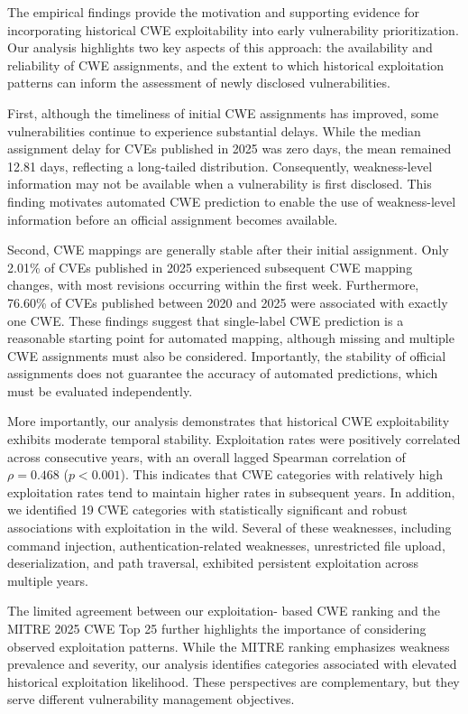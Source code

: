 \documentclass[conference,compsoc]{IEEEtran}
\begin{document}
The empirical findings provide the motivation and
supporting evidence for incorporating historical
CWE exploitability into early vulnerability
prioritization. Our analysis highlights two key
aspects of this approach: the availability and
reliability of CWE assignments, and the extent
to which historical exploitation patterns can
inform the assessment of newly disclosed
vulnerabilities.

First, although the timeliness of initial CWE
assignments has improved, some vulnerabilities
continue to experience substantial delays.
While the median assignment delay for CVEs
published in 2025 was zero days, the mean
remained 12.81 days, reflecting a long-tailed
distribution. Consequently, weakness-level
information may not be available when a
vulnerability is first disclosed. This finding
motivates automated CWE prediction to enable
the use of weakness-level information before
an official assignment becomes available.

Second, CWE mappings are generally stable after their initial assignment. Only 2.01\% of CVEs published in 2025 experienced subsequent CWE mapping changes, with most revisions occurring within the first week. Furthermore, 76.60\% of CVEs published between 2020 and 2025 were associated with exactly one CWE. These findings suggest that single-label CWE prediction is a reasonable starting point for automated mapping, although missing and multiple CWE assignments must also be considered. Importantly, the stability of official assignments does not guarantee the accuracy of automated predictions, which must be evaluated independently.

More importantly, our analysis demonstrates
that historical CWE exploitability exhibits
moderate temporal stability. Exploitation rates
were positively correlated across consecutive
years, with an overall lagged Spearman correlation
of $\rho=0.468$ ($p<0.001$). This indicates
that CWE categories with relatively high
exploitation rates tend to maintain higher
rates in subsequent years. In addition, we
identified 19 CWE categories with statistically
significant and robust associations with
exploitation in the wild. Several of these
weaknesses, including command injection,
authentication-related weaknesses, unrestricted
file upload, deserialization, and path traversal,
exhibited persistent exploitation across
multiple years.

The limited agreement between our exploitation-
based CWE ranking and the MITRE 2025 CWE Top 25
further highlights the importance of considering
observed exploitation patterns. While the MITRE
ranking emphasizes weakness prevalence and
severity, our analysis identifies categories
associated with elevated historical exploitation
likelihood. These perspectives are complementary,
but they serve different vulnerability management
objectives.
\end{document}
